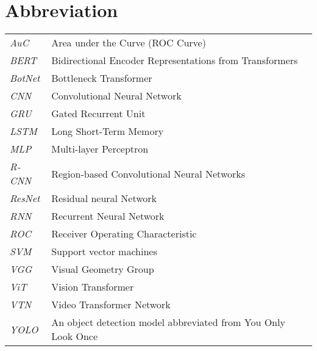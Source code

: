 \newpage
\makeatletter
\let\mcnewpage=\newpage
\newcommand{\TrickSupertabularIntoMulticols}{%
  \renewcommand\newpage{%
    \if@firstcolumn
      \hrule width\linewidth height0pt
      \columnbreak
    \else
      \mcnewpage
    \fi
  }%
}
\makeatother
\chapter{Abbreviation}
\begin{changemargin}{-0.5cm}{0cm}
\begin{multicols*}{2}
\TrickSupertabularIntoMulticols
\begin{supertabular}{>{\em}lp{6.2cm}}
AuC & Area under the Curve (ROC Curve) \\ [.5em]
BERT & Bidirectional Encoder Representations from Transformers \\ [.5em]
BotNet & Bottleneck Transformer \\ [.5em]
CNN & Convolutional Neural Network \\ [.5em]
GRU & Gated Recurrent Unit \\ [.5em]
LSTM & Long Short-Term Memory \\ [.5em]
MLP & Multi-layer Perceptron \\ [.5em]
R-CNN & Region-based Convolutional Neural Networks \\ [.5em]
ResNet & Residual neural Network \\ [.5em]
RNN & Recurrent Neural Network \\ [.5em]
ROC & Receiver Operating Characteristic \\ [.5em]
SVM & Support vector machines \\ [.5em]
VGG & Visual Geometry Group \\ [.5em]
ViT & Vision Transformer \\ [.5em]
VTN & Video Transformer Network \\ [.5em]
YOLO & An object detection model abbreviated from You Only Look Once \\ [.5em]
\end{supertabular}
\end{multicols*}
\end{changemargin}